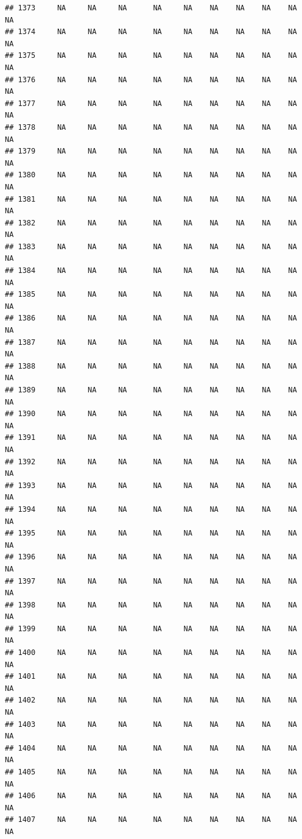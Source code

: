 \documentclass{article}\usepackage{graphicx, color}
\makeatletter
\newenvironment{kframe}{%
 \def\at@end@of@kframe{}%
 \ifinner\ifhmode%
  \def\at@end@of@kframe{\end{minipage}}%
  \begin{minipage}{\columnwidth}%
 \fi\fi%
 \def\FrameCommand##1{\hskip\@totalleftmargin \hskip-\fboxsep
 \colorbox{shadecolor}{##1}\hskip-\fboxsep
     \hskip-\linewidth \hskip-\@totalleftmargin \hskip\columnwidth}%
 \MakeFramed {\advance\hsize-\width
   \@totalleftmargin\z@ \linewidth\hsize
   \@setminipage}}%
 {\par\unskip\endMakeFramed%
 \at@end@of@kframe}
\newenvironment{knitrout}{}{} %
\makeatother
\begin{document}
\begin{knitrout}
\begin{kframe}
\begin{verbatim}
## 1373     NA     NA     NA      NA     NA    NA    NA    NA    NA     NA
## 1374     NA     NA     NA      NA     NA    NA    NA    NA    NA     NA
## 1375     NA     NA     NA      NA     NA    NA    NA    NA    NA     NA
## 1376     NA     NA     NA      NA     NA    NA    NA    NA    NA     NA
## 1377     NA     NA     NA      NA     NA    NA    NA    NA    NA     NA
## 1378     NA     NA     NA      NA     NA    NA    NA    NA    NA     NA
## 1379     NA     NA     NA      NA     NA    NA    NA    NA    NA     NA
## 1380     NA     NA     NA      NA     NA    NA    NA    NA    NA     NA
## 1381     NA     NA     NA      NA     NA    NA    NA    NA    NA     NA
## 1382     NA     NA     NA      NA     NA    NA    NA    NA    NA     NA
## 1383     NA     NA     NA      NA     NA    NA    NA    NA    NA     NA
## 1384     NA     NA     NA      NA     NA    NA    NA    NA    NA     NA
## 1385     NA     NA     NA      NA     NA    NA    NA    NA    NA     NA
## 1386     NA     NA     NA      NA     NA    NA    NA    NA    NA     NA
## 1387     NA     NA     NA      NA     NA    NA    NA    NA    NA     NA
## 1388     NA     NA     NA      NA     NA    NA    NA    NA    NA     NA
## 1389     NA     NA     NA      NA     NA    NA    NA    NA    NA     NA
## 1390     NA     NA     NA      NA     NA    NA    NA    NA    NA     NA
## 1391     NA     NA     NA      NA     NA    NA    NA    NA    NA     NA
## 1392     NA     NA     NA      NA     NA    NA    NA    NA    NA     NA
## 1393     NA     NA     NA      NA     NA    NA    NA    NA    NA     NA
## 1394     NA     NA     NA      NA     NA    NA    NA    NA    NA     NA
## 1395     NA     NA     NA      NA     NA    NA    NA    NA    NA     NA
## 1396     NA     NA     NA      NA     NA    NA    NA    NA    NA     NA
## 1397     NA     NA     NA      NA     NA    NA    NA    NA    NA     NA
## 1398     NA     NA     NA      NA     NA    NA    NA    NA    NA     NA
## 1399     NA     NA     NA      NA     NA    NA    NA    NA    NA     NA
## 1400     NA     NA     NA      NA     NA    NA    NA    NA    NA     NA
## 1401     NA     NA     NA      NA     NA    NA    NA    NA    NA     NA
## 1402     NA     NA     NA      NA     NA    NA    NA    NA    NA     NA
## 1403     NA     NA     NA      NA     NA    NA    NA    NA    NA     NA
## 1404     NA     NA     NA      NA     NA    NA    NA    NA    NA     NA
## 1405     NA     NA     NA      NA     NA    NA    NA    NA    NA     NA
## 1406     NA     NA     NA      NA     NA    NA    NA    NA    NA     NA
## 1407     NA     NA     NA      NA     NA    NA    NA    NA    NA     NA

\end{verbatim}
\end{kframe}
\end{knitrout}
\end{document}
